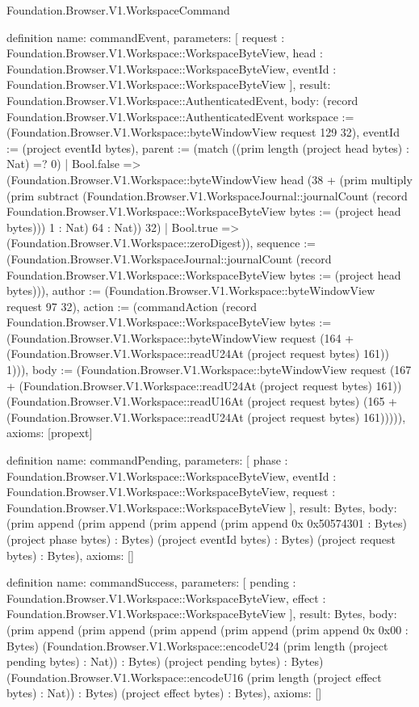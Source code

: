 \begin{lexlean}{Foundation.Browser.V1.WorkspaceCommand}
\begin{semanticmodule}
definition{
  name: commandEvent,
  parameters: [
    request : Foundation.Browser.V1.Workspace::WorkspaceByteView,
    head : Foundation.Browser.V1.Workspace::WorkspaceByteView,
    eventId : Foundation.Browser.V1.Workspace::WorkspaceByteView
  ],
  result: Foundation.Browser.V1.Workspace::AuthenticatedEvent,
  body: (record Foundation.Browser.V1.Workspace::AuthenticatedEvent {workspace := (Foundation.Browser.V1.Workspace::byteWindowView request 129 32), eventId := (project eventId bytes), parent := (match ((prim length (project head bytes) : Nat) =? 0)
    | Bool.false => (Foundation.Browser.V1.Workspace::byteWindowView head (38 + (prim multiply (prim subtract (Foundation.Browser.V1.WorkspaceJournal::journalCount (record Foundation.Browser.V1.Workspace::WorkspaceByteView {bytes := (project head bytes)})) 1 : Nat) 64 : Nat)) 32)
    | Bool.true => (Foundation.Browser.V1.Workspace::zeroDigest)), sequence := (Foundation.Browser.V1.WorkspaceJournal::journalCount (record Foundation.Browser.V1.Workspace::WorkspaceByteView {bytes := (project head bytes)})), author := (Foundation.Browser.V1.Workspace::byteWindowView request 97 32), action := (commandAction (record Foundation.Browser.V1.Workspace::WorkspaceByteView {bytes := (Foundation.Browser.V1.Workspace::byteWindowView request (164 + (Foundation.Browser.V1.Workspace::readU24At (project request bytes) 161)) 1)})), body := (Foundation.Browser.V1.Workspace::byteWindowView request (167 + (Foundation.Browser.V1.Workspace::readU24At (project request bytes) 161)) (Foundation.Browser.V1.Workspace::readU16At (project request bytes) (165 + (Foundation.Browser.V1.Workspace::readU24At (project request bytes) 161))))}),
  axioms: [propext]
}

definition{
  name: commandPending,
  parameters: [
    phase : Foundation.Browser.V1.Workspace::WorkspaceByteView,
    eventId : Foundation.Browser.V1.Workspace::WorkspaceByteView,
    request : Foundation.Browser.V1.Workspace::WorkspaceByteView
  ],
  result: Bytes,
  body: (prim append (prim append (prim append (prim append 0x 0x50574301 : Bytes) (project phase bytes) : Bytes) (project eventId bytes) : Bytes) (project request bytes) : Bytes),
  axioms: []
}

definition{
  name: commandSuccess,
  parameters: [
    pending : Foundation.Browser.V1.Workspace::WorkspaceByteView,
    effect : Foundation.Browser.V1.Workspace::WorkspaceByteView
  ],
  result: Bytes,
  body: (prim append (prim append (prim append (prim append (prim append 0x 0x00 : Bytes) (Foundation.Browser.V1.Workspace::encodeU24 (prim length (project pending bytes) : Nat)) : Bytes) (project pending bytes) : Bytes) (Foundation.Browser.V1.Workspace::encodeU16 (prim length (project effect bytes) : Nat)) : Bytes) (project effect bytes) : Bytes),
  axioms: []
}


\end{semanticmodule}
\end{lexlean}
